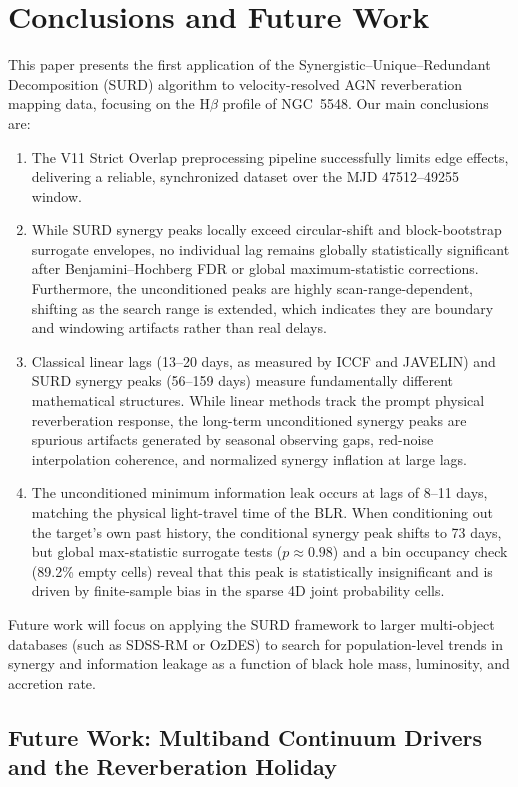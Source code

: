 \documentclass[fleqn,usenatbib]{mnras}
\begin{document}
\section{Conclusions and Future Work}
\label{sec:conclusion}

This paper presents the first application of the Synergistic–Unique–Redundant Decomposition (SURD) algorithm to velocity-resolved AGN reverberation mapping data, focusing on the H\(\beta\) profile of NGC~5548. Our main conclusions are:
\begin{enumerate}
\item The V11 Strict Overlap preprocessing pipeline successfully limits edge effects, delivering a reliable, synchronized dataset over the MJD 47512--49255 window.
\item While SURD synergy peaks locally exceed circular-shift and block-bootstrap surrogate envelopes, no individual lag remains globally statistically significant after Benjamini–Hochberg FDR or global maximum-statistic corrections. Furthermore, the unconditioned peaks are highly scan-range-dependent, shifting as the search range is extended, which indicates they are boundary and windowing artifacts rather than real delays.
\item Classical linear lags (13--20 days, as measured by ICCF and JAVELIN) and SURD synergy peaks (56--159 days) measure fundamentally different mathematical structures. While linear methods track the prompt physical reverberation response, the long-term unconditioned synergy peaks are spurious artifacts generated by seasonal observing gaps, red-noise interpolation coherence, and normalized synergy inflation at large lags.
\item The unconditioned minimum information leak occurs at lags of 8--11 days, matching the physical light-travel time of the BLR. When conditioning out the target's own past history, the conditional synergy peak shifts to 73 days, but global max-statistic surrogate tests ($p \approx 0.98$) and a bin occupancy check (89.2\% empty cells) reveal that this peak is statistically insignificant and is driven by finite-sample bias in the sparse 4D joint probability cells.
\end{enumerate}

Future work will focus on applying the SURD framework to larger multi-object databases (such as SDSS-RM or OzDES) to search for population-level trends in synergy and information leakage as a function of black hole mass, luminosity, and accretion rate.

\subsection{Future Work: Multiband Continuum Drivers and the Reverberation Holiday}
\label{sec:future_multiband}
\end{document}
